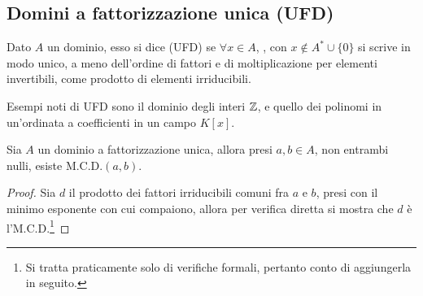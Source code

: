 \documentclass[11pt]{scrartcl}
\begin{document}
\newpage
\subsection{Domini a fattorizzazione unica (UFD)}
\begin{definition}
    Dato $A$ un dominio, esso si dice  (UFD) se $\forall x \in A$, , con $x \not\in A^* \cup \{0\}$ si scrive in modo
    unico, a meno dell'ordine di fattori e di moltiplicazione per elementi invertibili, come prodotto di elementi irriducibili.
\end{definition}

\begin{example}
    Esempi noti di UFD sono il dominio degli interi $\mathbb Z$, e quello dei polinomi in un'ordinata a coefficienti in un campo $K[x]$.
\end{example}

\begin{proposition}
    Sia $A$ un dominio a fattorizzazione unica, allora presi $a,b \in A$, non entrambi nulli, esiste $\text{M.C.D.}(a,b)$.
\end{proposition}

\begin{proof}
    Sia $d$ il prodotto dei fattori irriducibili comuni fra $a$ e $b$, presi con il minimo esponente con cui compaiono,
    allora per verifica diretta si mostra che $d$ è l'M.C.D.\footnote{Si tratta praticamente solo di verifiche formali, pertanto conto di aggiungerla in seguito.}
\end{proof}
\end{document}
